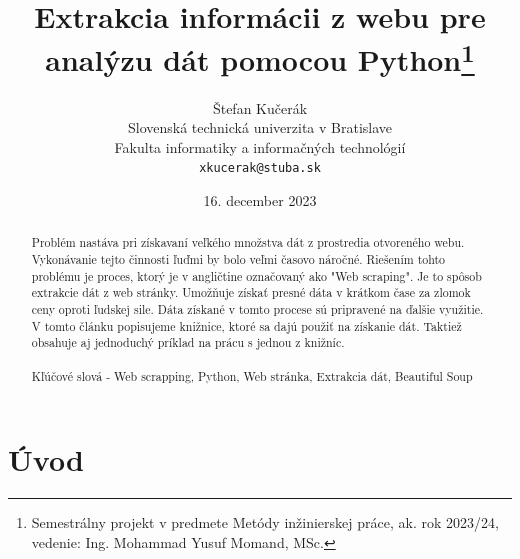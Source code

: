 \documentclass[10pt,twoside,slovak,a4paper]{article}
\title{Extrakcia informácii z webu pre analýzu dát pomocou Python\thanks{Semestrálny projekt v predmete Metódy inžinierskej práce, ak. rok 2023/24, vedenie: Ing. Mohammad Yusuf Momand, MSc.}} %
\author{Štefan Kučerák\\[2pt]
	{\small Slovenská technická univerzita v Bratislave}\\
	{\small Fakulta informatiky a informačných technológií}\\
	{\small \texttt{xkucerak@stuba.sk}}
	}
\date{\small 16. december 2023}
\begin{document}
\maketitle


\begin{abstract}
Problém nastáva pri získavaní veľkého množstva dát z prostredia otvoreného webu. Vykonávanie tejto činnosti ľuďmi by bolo veľmi časovo náročné. Riešením tohto problému je proces, ktorý je v angličtine označovaný ako "Web scraping". Je to spôsob extrakcie dát z web stránky. Umožňuje získať presné dáta v krátkom čase za zlomok ceny oproti ľudskej sile. Dáta získané v tomto procese sú pripravené na ďalšie využitie. V tomto článku popisujeme knižnice, ktoré sa dajú použiť na získanie dát. Taktiež obsahuje aj jednoduchý príklad na prácu s jednou z knižníc.
\\
\\
Kľúčové slová - Web scrapping, Python, Web stránka, Extrakcia dát, Beautiful Soup
\end{abstract}



\section{Úvod}
\end{document}
